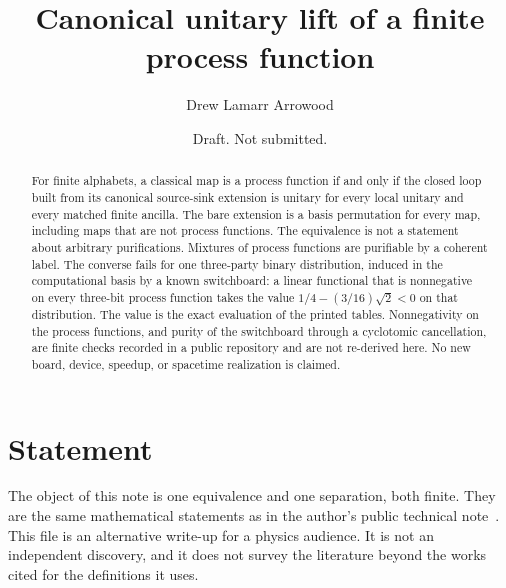 \documentclass[aps,pra,reprint,amsmath,amssymb,nofootinbib]{revtex4-2}
\begin{document}
\title{Canonical unitary lift of a finite process function}
\author{Drew Lamarr Arrowood}
\date{Draft. Not submitted.}

\begin{abstract}
For finite alphabets, a classical map is a process function if and only if the closed loop built from its canonical source-sink extension is unitary for every local unitary and every matched finite ancilla. The bare extension is a basis permutation for every map, including maps that are not process functions. The equivalence is not a statement about arbitrary purifications. Mixtures of process functions are purifiable by a coherent label. The converse fails for one three-party binary distribution, induced in the computational basis by a known switchboard: a linear functional that is nonnegative on every three-bit process function takes the value \(1/4-(3/16)\sqrt{2}<0\) on that distribution. The value is the exact evaluation of the printed tables. Nonnegativity on the process functions, and purity of the switchboard through a cyclotomic cancellation, are finite checks recorded in a public repository and are not re-derived here. No new board, device, speedup, or spacetime realization is claimed.
\end{abstract}
\maketitle

\section{Statement}
\label{sec:statement}
The object of this note is one equivalence and one separation, both finite. They are the same mathematical statements as in the author's public technical note~\cite{archive}. This file is an alternative write-up for a physics audience. It is not an independent discovery, and it does not survey the literature beyond the works cited for the definitions it uses.
\end{document}
